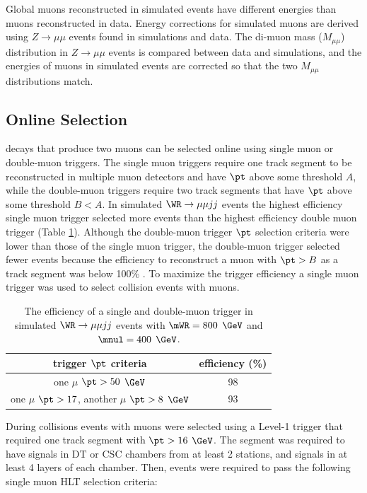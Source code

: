 Global muons reconstructed in simulated events have different energies than muons reconstructed in data.  Energy 
corrections for simulated muons are derived using $Z \rightarrow \mu\mu$ events found in simulations and data.  The di-muon mass 
($M_{\mu\mu}$) distribution in $Z \rightarrow \mu\mu$ events is compared between data and simulations, and the energies of muons 
in simulated events are corrected so that the two $M_{\mu\mu}$ distributions match.

\subsection{Online Selection}
\label{sec:muOnlineSel}
\WR decays that produce two muons can be selected online using single muon or double-muon triggers.  The single muon 
triggers require one track segment to be reconstructed in multiple muon detectors and have $\pt$ above some threshold $A$, while the 
double-muon triggers require two track segments that have $\pt$ above some threshold $B < A$.  In simulated $\WR \rightarrow \mu\mu jj$ events the 
highest efficiency single muon trigger selected more \WR events than the highest efficiency double muon trigger (Table \ref{tab:singleVsDblMuHlt}).  
Although the double-muon trigger $\pt$ selection criteria were lower than those of the single muon trigger, the double-muon trigger 
selected fewer \WR events because the efficiency to reconstruct a muon with $\pt > B$ as a track segment was below 100\% \cite{cmsMuonRecoRunTwo}.  
To maximize the trigger efficiency a single muon trigger was used to select collision events with muons.

\begin{table}[h]
	\caption{The efficiency of a single and double-muon trigger in simulated $\WR \rightarrow \mu\mu jj$ events with $\mWR = 800$ $\GeV$ 
		and $\mnul = 400$ $\GeV$.}
	\label{tab:singleVsDblMuHlt}
	\centering
	\begin{tabular}{c|c}
		trigger $\pt$ criteria & efficiency (\%) \\  \hline
		one $\mu$ $\pt >50$ $\GeV$ & 98  \\ 
		one $\mu$ $\pt >17$, another $\mu$ $\pt >8$ $\GeV$ & 93  \\
	\end{tabular}
\end{table}

During collisions events with muons were selected using a Level-1 trigger that required one track segment with $\pt > 16$ $\GeV$.  The 
segment was required to have signals in DT or CSC chambers from at least 2 stations, and signals in at least 4 layers of each chamber.  
Then, events were required to pass the following single muon HLT selection criteria:

